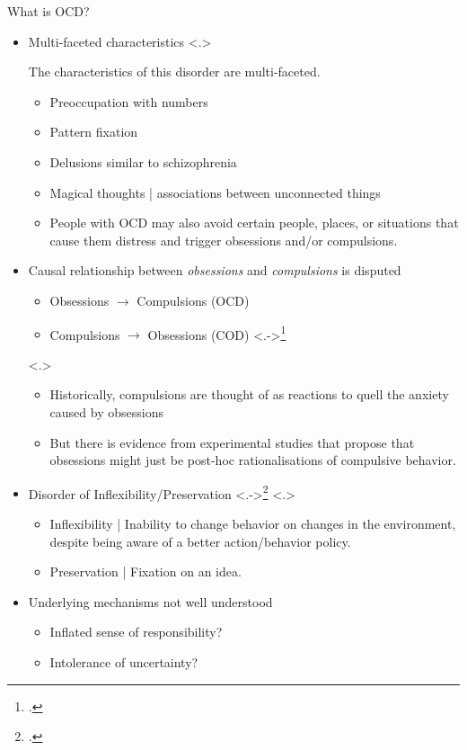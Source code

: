 \documentclass[t,aspectratio=169,xcolor=dvipsnames]{beamer}
\newcommand{\citef}[1]{\only<.->{\footcite{#1}}}
\begin{document}
\begin{frame}{What is OCD?}
\begin{itemize}
        \item<+-> Multi-faceted characteristics
        \note<.>{The characteristics of this disorder are multi-faceted.
            \begin{itemize}
                \item Preoccupation with numbers
                \item Pattern fixation
                \item Delusions similar to schizophrenia
                \item Magical thoughts | associations between unconnected things
                \item People with OCD may also avoid certain people, places, or situations that cause them distress and trigger obsessions and/or compulsions.
            \end{itemize}
        }

        \item<+-> Causal relationship between \textit{obsessions} and \textit{compulsions} is disputed
        \begin{itemize}
            \item Obsessions $\longrightarrow$ Compulsions (OCD)
            \item Compulsions $\longrightarrow$ Obsessions (COD) \citef{gillan2014goal}
        \end{itemize}
        \note<.>{
            \begin{itemize}
                \item Historically, compulsions are thought of as reactions to quell the anxiety caused by obsessions
                \item But there is evidence from experimental studies that propose that obsessions might just be post-hoc rationalisations of compulsive behavior. \citep{gillan2014goal}
            \end{itemize}
        }
        
        \item<+-> Disorder of Inflexibility/Preservation \citef{fradkin2018rigidly}
        \note<.>{
            \begin{itemize}
                \item Inflexibility | Inability to change behavior on changes in the environment, despite being aware of a better action/behavior policy.
                \item Preservation | Fixation on an idea.
            \end{itemize}
        }

        \item<+-> Underlying mechanisms not well understood
        \begin{itemize}
            \item Inflated sense of responsibility?
            \item Intolerance of uncertainty?
        \end{itemize}
    \end{itemize}
    \vspace*{5mm}
\end{frame}
\end{document}
